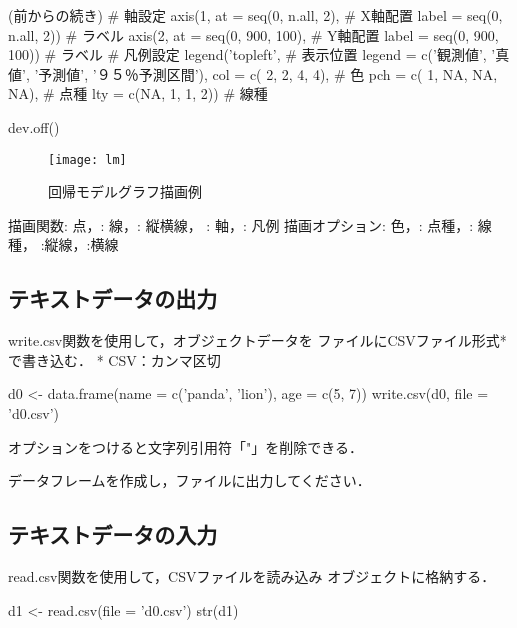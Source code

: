 \documentclass[../main]{subfiles}
\begin{document}
\begin{ConsoleR}
(前からの続き)
# 軸設定
axis(1, at    = seq(0, n.all, 2), # X軸配置
        label = seq(0, n.all, 2)) # ラベル
axis(2, at    = seq(0, 900, 100), # Y軸配置
        label = seq(0, 900, 100)) # ラベル 
# 凡例設定
legend('topleft', # 表示位置
  legend = c('観測値', '真値',
             '予測値', '９５％予測区間'),
  col    = c( 2,  2,  4,  4), # 色
  pch    = c( 1, NA, NA, NA), # 点種
  lty    = c(NA,  1,  1,  2)) # 線種

dev.off()
\end{ConsoleR}

\begin{figure}[H]
  \centering
  \texttt{[image: lm]}
  \caption{回帰モデルグラフ描画例}
  \label{fig:lm}
\end{figure}
\vspace{-13mm}
描画関数: 点，: 線，: 縦横線，
: 軸，: 凡例
描画オプション: 色，: 点種，: 線種，
:縦線，:横線

\subsection{テキストデータの出力}

{
  write.csv関数を使用して，オブジェクトデータを
  ファイルにCSVファイル形式*で書き込む．
  * CSV：カンマ区切
} 

\begin{ConsoleR}
d0 <- data.frame(name = c('panda', 'lion'),
                  age = c(5, 7))
write.csv(d0, file = 'd0.csv')
\end{ConsoleR}

オプションをつけると文字列引用符「"」を削除できる．

\begin{exercise}
  データフレームを作成し，ファイルに出力してください．
\tcblower
\end{exercise}

\subsection{テキストデータの入力}

{
  read.csv関数を使用して，CSVファイルを読み込み
  オブジェクトに格納する．
}

\begin{ConsoleR}
  d1 <- read.csv(file = 'd0.csv')
  str(d1)
\end{ConsoleR}
\end{document}
